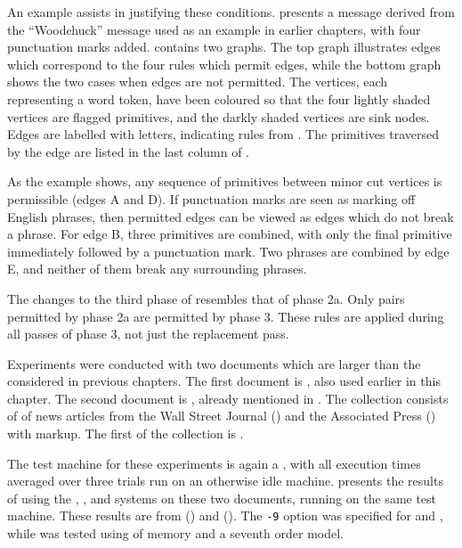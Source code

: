 An example assists in justifying these conditions.
 presents a message derived 
from the ``Woodchuck'' message used as an example 
in earlier chapters, with four punctuation marks added.
 contains two graphs.  The
top graph illustrates edges which correspond to the four 
rules which permit edges, while the bottom graph shows the
two cases when edges are not permitted.  The vertices, each
representing a word token, have
been coloured so that the four lightly shaded vertices are
flagged primitives, and the darkly shaded vertices are sink
nodes.  Edges are labelled with letters, indicating 
rules from .  
The primitives traversed by the 
edge are listed in the last column of 
.

As the example shows, any sequence
of primitives between minor cut vertices is permissible 
(edges A and D).  If punctuation marks are seen as marking
off English phrases, then permitted edges can be viewed as edges
which do not break a phrase.  For edge B, three primitives are 
combined, with only the final primitive immediately followed 
by a punctuation mark.  Two phrases are combined by edge E, and 
neither of them break any surrounding phrases.

The changes to the third phase of \remerge resembles that of 
phase 2a.  Only pairs permitted by phase 2a are permitted by
phase 3.  These rules are applied during all passes of phase 3,
not just the replacement pass.


Experiments were conducted with two documents which
are larger than the  considered in previous chapters.
The first document is \wsjb, also used earlier in this
chapter.  The second document is \news, already
mentioned in .  The \news
collection consists of  of news articles from
the Wall Street Journal (\wsj) and the Associated Press (\ap) 
with \sgml markup. The first  of the \news collection 
is \wsjb.

The test machine for these experiments is again a \vipe, with
all execution times averaged over three trials run on an otherwise idle
machine.
 presents the results of using
the \gzip, \bzip, and \ppmd systems on these two documents, running
on the same test machine.  These results are from 
 () and 
().
The {\texttt {-9}} option was specified for \gzip and \bzip, while \ppmd
was tested using  of memory and a seventh order model.

